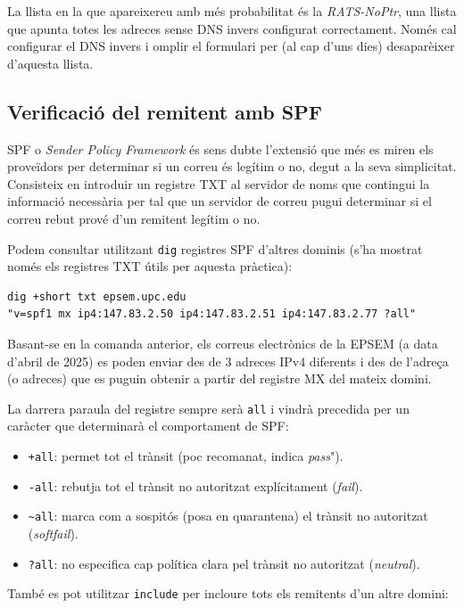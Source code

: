 \documentclass{practicaitic}
\begin{document}
La llista en la que apareixereu amb més probabilitat és la \textit{RATS-NoPtr},
una llista que apunta totes les adreces sense DNS invers configurat
correctament. Només cal configurar el DNS invers i omplir el formulari per
(al cap d'uns dies) desaparèixer d'aquesta llista.

\subsection{Verificació del remitent amb SPF}

SPF o \textit{Sender Policy Framework} és sens dubte l'extensió que més es miren
els proveïdors per determinar si un correu és legítim o no, degut a la seva
simplicitat. Consisteix en introduir un registre TXT al servidor de noms
que contingui la informació necessària per tal que un servidor de correu pugui
determinar si el correu rebut prové d'un remitent legítim o no.

Podem consultar utilitzant \texttt{dig} registres SPF d'altres dominis
(s'ha mostrat només els registres TXT útils per aquesta pràctica):

\begin{verbatim}
dig +short txt epsem.upc.edu
"v=spf1 mx ip4:147.83.2.50 ip4:147.83.2.51 ip4:147.83.2.77 ?all"
\end{verbatim}

Basant-se en la comanda anterior, els correus electrònics de la EPSEM
(a data d'abril de 2025) es poden enviar des de 3 adreces IPv4 diferents i
des de l'adreça (o adreces) que es puguin obtenir a partir del
registre MX del mateix domini.

La darrera paraula del registre sempre serà \texttt{all} i vindrà precedida per
un caràcter que determinarà el comportament de SPF:
\begin{itemize}
  \item \texttt{+all}: permet tot el trànsit (poc recomanat, indica \textit{pass}").
  \item \texttt{-all}: rebutja tot el trànsit no autoritzat explícitament (\textit{fail}).
  \item \verb|~all|: marca com a sospitós (posa en quarantena) el trànsit no autoritzat (\textit{softfail}).
  \item \texttt{?all}: no especifica cap política clara pel trànsit no autoritzat (\textit{neutral}).
\end{itemize}

També es pot utilitzar \texttt{include} per incloure tots els remitents d'un altre
domini:
\end{document}
